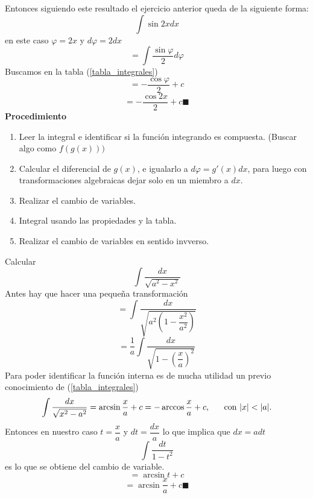 \documentclass[10pt,twoside]{SelfArx} %
\begin{document}
 Entonces siguiendo este resultado el ejercicio anterior queda de la siguiente forma:
 \begin{equation}
 \int\sin2xdx
 \end{equation}
 en este caso $ \varphi=2x $ y $ d\varphi=2dx $
 \begin{equation}
 =\int \dfrac{\sin\varphi}{2} d\varphi
 \end{equation}
 Buscamos en la tabla (\ref{tabla_integrales})
 \begin{equation}
 =-\dfrac{\cos\varphi}{2}+c
 \end{equation}
 \begin{equation}
 =-\dfrac{\cos 2x}{2}+c\blacksquare
 \end{equation}
 \textbf{Procedimiento}
 \begin{enumerate}
 	\item Leer la integral e identificar si la funci\'on integrando es compuesta. (Buscar algo como $ f(g(x))) $
 	\item Calcular el diferencial de $ g(x) $, e igualarlo a $ d\varphi=g'(x)dx $, para luego con transformaciones algebraicas dejar solo en un miembro a $ dx $.
 	\item Realizar el cambio de variables.
 	\item Integral usando las propiedades y la tabla.
 	\item Realizar el cambio de variables en sentido invverso.
 \end{enumerate}
 
 \begin{ejemplo}
 	Calcular
 	\begin{equation}
 	\int \dfrac{dx}{\sqrt{a^{2}-x^{2}}}
 	\end{equation}
 	Antes hay que hacer una pequeña transformación
 	\begin{equation}
=\displaystyle\int \dfrac{dx}{\sqrt{a^{2}\left (1-\dfrac{x^{2}}{a^{2}}\right )}}
 	\end{equation}
 	\begin{equation}
 =	\displaystyle\dfrac{1}{a}\int \dfrac{dx}{\sqrt{1-\left (\dfrac{x}{a}\right )^{2}}}
 	\end{equation}
 	Para poder identificar la función interna es de mucha utilidad un previo conocimiento de (\ref{tabla_integrales})
	 \[ \displaystyle\int \dfrac{dx}{\sqrt{x^{2}-a^{2}}}=\arcsin \dfrac{x}{a}+c=-\arccos\dfrac{x}{a}+c, \;\;\;\;\;\;\mbox{con $ |x|<|a| $.} \]
	 Entonces en nuestro caso $ t=\dfrac{x}{a} $ y $ dt=\dfrac{dx}{a} $ lo que implica que $ dx=adt $
	 \begin{equation}
	 \int \dfrac{dt}{1-t^{2}}
	 \end{equation}
es lo que se obtiene del cambio de variable.
\begin{equation}
=\arcsin t +c
\end{equation}
\begin{equation}
=\arcsin \dfrac{x}{a}+c\blacksquare
\end{equation}

 \end{ejemplo}
 
\end{document}
